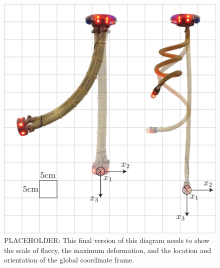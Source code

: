 \begin{figure}
    \centering
    \includegraphics[width=\linewidth]{figures/robotsDiagram_v2.pdf}
    \caption{PLACEHOLDER: This final version of this diagram needs to show the scale of flaccy, the maximum deformation, and the location and orientation of the global coordinate frame.}
    \label{fig:flaccy}
\end{figure}